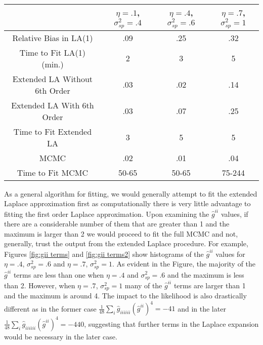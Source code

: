 \documentclass[11pt]{isuthesis}
\begin{document}
	\begin{table}[h]
		\begin{center}
			\begin{tabular}{ |c|c|c|c| } 
				\hline
				& $\eta=.1$, $\sigma_{sp}^2=.4$&$\eta=.4$, $\sigma_{sp}^2=.6$& $\eta=.7$, $\sigma_{sp}^2=1$\\
				\hline
				Relative Bias in LA(1) & .09 & .25 & .32\\ 
				Time to Fit LA(1) (min.)& 2 & 3 & 5\\
				\hline
				Extended LA Without 6th Order & .03 & .02 & .14\\
				Extended LA With 6th Order& .03 & .07 & .25\\
				Time to Fit Extended LA & 3 & 5 &  5\\
				\hline
				MCMC & .02 & .01 & .04\\
				Time to Fit MCMC  & 50-65 & 50-65 & 75-244\\
				\hline
			\end{tabular}
		\end{center}
		\label{Simulations}
	\end{table}
	  As a general algorithm for fitting, we would generally attempt to fit the extended Laplace approximation first as computationally there is very little advantage to fitting the first order Laplace approximation.  Upon examining the $\hat{g}^{ii}$ values, if there are a considerable number of them that are greater than 1 and the maximum is larger than 2 we would proceed to fit the full MCMC and not, generally, trust the output from the extended Laplace procedure.  For example, Figures \ref{fig:gii terms} and \ref{fig:gii terms2} show histograms of the $\hat{g}^{ii}$ values for $\eta=.4$, $\sigma_{sp}^2=.6$ and $\eta=.7$, $\sigma_{sp}^2=1$.  As evident in the Figure, the majority of the $\hat{g}^{ii}$ terms are less than one when $\eta=.4$ and $\sigma_{sp}^2=.6$ and the maximum is less than 2.  However, when $\eta=.7$, $\sigma_{sp}^2=1$  many of the $\hat{g}^{ii}$ terms are larger than 1  and the maximum is around 4.  The impact to the likelihood is also drastically different as in the former case $\frac{1}{48}\sum_{i}\hat{g}_{iiiiii}(\hat{g}^{ii})^4=-41$ and in the later $\frac{1}{48}\sum_{i}\hat{g}_{iiiiii}(\hat{g}^{ii})^4=-440$, suggesting that further terms in the Laplace expansion would be necessary in the later case.
	
\end{document}
